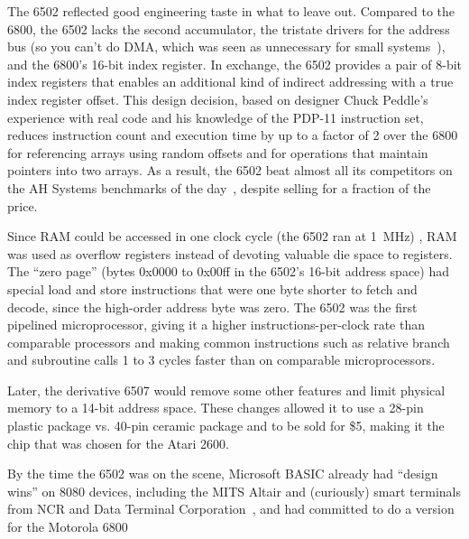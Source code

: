     \begin{geeknote}
The 6502 reflected good engineering taste in what to leave out.
Compared to the 6800, the 6502 lacks the second accumulator, the
tristate drivers for the address bus (so you can't do DMA, which was seen as
unnecessary for small systems~\cite{byte75:6502}), 
and the 6800's 16-bit index register.  In exchange, the 6502 provides a pair
of 8-bit index registers that enables an additional kind of
indirect addressing with a true index register offset.
This design decision, based on designer Chuck Peddle's experience with real
code and his knowledge of the PDP-11 instruction set, 
reduces instruction count and execution time by up to a
factor of 2 over the 6800 for referencing arrays using random
offsets and for operations that
maintain pointers into two arrays.
As a result, the 6502
beat almost all its competitors on  the AH Systems benchmarks of
the day~\cite{edn75:6502}, despite selling for a fraction of the price.

Since RAM could be accessed in one
clock cycle (the 6502 ran at
1~MHz) , RAM was used as overflow registers instead of devoting valuable die
space to registers.  The ``zero
page'' (bytes 0x0000 to 0x00ff in the 6502's 16-bit address space) had
special load and store instructions that were one byte shorter to fetch and
decode, since the high-order address byte was zero.
The 6502 was the first pipelined
microprocessor, giving it a higher instructions-per-clock 
rate than comparable processors and making
common instructions such as relative
branch and subroutine calls 1 to 3 cycles faster than
on comparable microprocessors.  

Later, the derivative 6507 would
remove some other features and limit
physical memory to a 14-bit address space.  These changes allowed it to
use a 28-pin 
plastic package vs. 40-pin ceramic package and to be sold for \$5,
making it the chip that was chosen for the Atari 2600.
    \end{geeknote}

By the time the 6502 was on the scene, Microsoft BASIC already had
``design wins'' on 8080 devices, including the MITS Altair and
(curiously) smart terminals from NCR and Data Terminal
Corporation~\cite[p. 96]{gates}, and had committed to do a version for
the Motorola 6800


